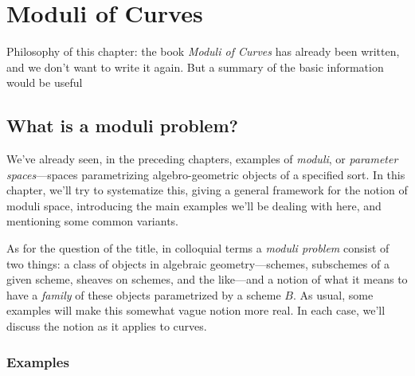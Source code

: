 

\chapter{Moduli of Curves}
\label{Moduli chapter}

Philosophy of this chapter: the book \emph{Moduli of Curves} has already been written, and we don't want to write it again. But a summary of the basic information would be useful

\section{What is a moduli problem?}

We've already seen, in the preceding chapters, examples of \emph{moduli}, or \emph{parameter spaces}---spaces parametrizing algebro-geometric objects of a specified sort. In this chapter, we'll try to systematize this, giving a general framework for the notion of moduli space, introducing the main examples we'll be dealing with here, and mentioning some common variants.

As for the question of the title, in colloquial terms a \emph{moduli problem} consist of two things: a class of objects in algebraic geometry---schemes, subschemes of a given scheme, sheaves on schemes, and the like---and a notion of what it means to have a \emph{family} of these objects parametrized by a scheme $B$. As usual, some examples will make this somewhat vague notion more real. In each case, we'll discuss the notion as it applies to curves.

\subsection{Examples}

